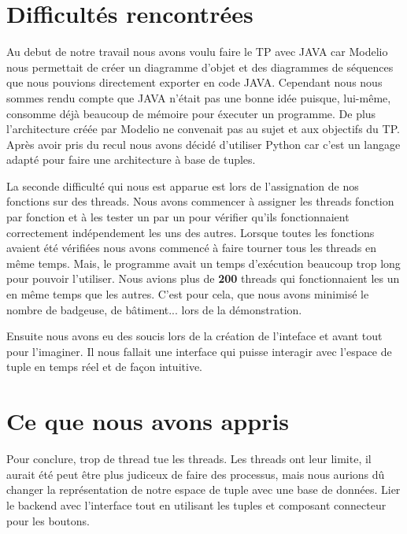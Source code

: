 \documentclass[a4paper,10pt]{article}
\begin{document}
    \section{Difficultés rencontrées}
    \label{difficulty}
    \par Au debut de notre travail nous avons voulu faire le TP avec JAVA car Modelio nous permettait de créer un diagramme d'objet et des diagrammes de séquences que nous pouvions directement exporter en code JAVA.
    Cependant nous nous sommes rendu compte que JAVA n'était pas une bonne idée puisque, lui-même, consomme déjà beaucoup de mémoire pour éxecuter un programme.
    De plus l'architecture créée par Modelio ne convenait pas au sujet et aux objectifs du TP. Après avoir pris du recul nous avons décidé d'utiliser Python car c'est un langage adapté pour faire une architecture à base de tuples.
    \\
    \par
    La seconde difficulté qui nous est apparue est lors de l'assignation de nos fonctions sur des threads. Nous avons commencer à assigner les threads fonction par fonction et à les tester un par un pour vérifier qu'ils fonctionnaient correctement indépendement les uns des autres. Lorsque toutes les fonctions avaient été vérifiées nous avons commencé à faire tourner tous les threads en même temps. Mais, le programme avait un temps d'exécution beaucoup trop long pour pouvoir l'utiliser. Nous avions plus de \textbf{200} threads qui fonctionnaient les un en même temps que les autres. C'est pour cela, que nous avons minimisé le nombre de badgeuse, de bâtiment... lors de la démonstration.
    \\
    \par
     Ensuite nous avons eu des soucis lors de la création de l'inteface et avant tout pour l'imaginer. Il nous fallait une interface qui puisse interagir avec l'espace de tuple en temps réel et de façon intuitive.

    \pagebreak
    \section{Ce que nous avons appris}
    Pour conclure, trop de thread tue les threads. Les threads ont leur limite, il aurait été peut être plus judiceux de faire des processus, mais nous aurions dû changer la représentation de notre espace de tuple avec une base de données. Lier le backend avec l'interface tout en utilisant les tuples et composant connecteur pour les boutons.
\end{document}
